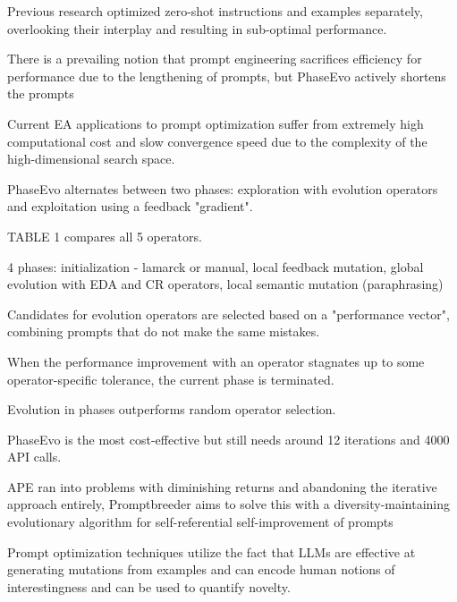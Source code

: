 Previous research optimized zero-shot instructions and examples separately, overlooking their interplay and resulting in sub-optimal performance. \cite{cui2024phaseevounifiedincontextprompt}

There is a prevailing notion that prompt engineering sacrifices efficiency for performance due to the lengthening of prompts, but PhaseEvo actively shortens the prompts \cite{cui2024phaseevounifiedincontextprompt}

Current EA applications to prompt optimization suffer from extremely high computational cost and slow convergence speed due to the complexity of the high-dimensional search space. \cite{cui2024phaseevounifiedincontextprompt}

PhaseEvo alternates between two phases: exploration with evolution operators and exploitation using a feedback "gradient". \cite{cui2024phaseevounifiedincontextprompt}

TABLE 1  compares all 5 operators.  \cite{cui2024phaseevounifiedincontextprompt}

4 phases: initialization - lamarck or manual, local feedback mutation, global evolution with EDA and CR operators, local semantic mutation (paraphrasing) \cite{cui2024phaseevounifiedincontextprompt}

Candidates for evolution operators are selected based on a "performance vector", combining prompts that do not make the same mistakes.  \cite{cui2024phaseevounifiedincontextprompt}

When the performance improvement with an operator stagnates up to some operator-specific tolerance, the current phase is terminated. \cite{cui2024phaseevounifiedincontextprompt}

Evolution in phases outperforms random operator selection. \cite{cui2024phaseevounifiedincontextprompt}

PhaseEvo is the most cost-effective but still needs around 12 iterations and 4000 API calls. \cite{cui2024phaseevounifiedincontextprompt}


APE \cite{zhou2023largelanguagemodelshumanlevel} ran into problems with diminishing returns and abandoning the iterative approach entirely, Promptbreeder aims to solve this with a diversity-maintaining evolutionary algorithm for self-referential self-improvement of prompts \cite{fernando2023promptbreederselfreferentialselfimprovementprompt}

Prompt optimization techniques utilize the fact that LLMs are effective at generating mutations from examples and can encode human notions of interestingness and can be used to quantify novelty. \cite{fernando2023promptbreederselfreferentialselfimprovementprompt}


